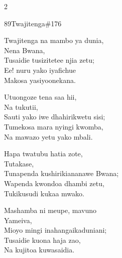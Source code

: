 \begin{multicols}{2}
\begin{hymn}{89}{Twajitenga}{\#176}
\begin{stanza}
Twajitenga na mambo ya dunia,\\
Nena Bwana,\\
Tusaidie tusizitetee njia zetu;\\
Ee! nuru yako iyafichue\\
Makosa yasiyoonekana.
\end{stanza}
\begin{stanza}
Utuongoze tena saa hii,\\
Na tukutii,\\
Sauti yako iwe dhahirikwetu sisi;\\
Tumekosa mara nyingi kwomba,\\
Na mawazo yetu yako mbali.
\end{stanza}
\begin{stanza}
Hapa twatubu hatia zote,\\
Tutakase,\\
Tunapenda kushirikiananawe Bwana;\\
Wapenda kwondoa dhambi zetu,\\
Tukikusudi kukaa mwako.
\end{stanza}
\begin{stanza}
Mashamba ni meupe, mavuno\\
Yameiva,\\
Mioyo mingi inahangaikaduniani;\\
Tusaidie kuona haja zao,\\
Na kujitoa kuwasaidia.
\end{stanza}
\end{hymn}


\end{multicols}
